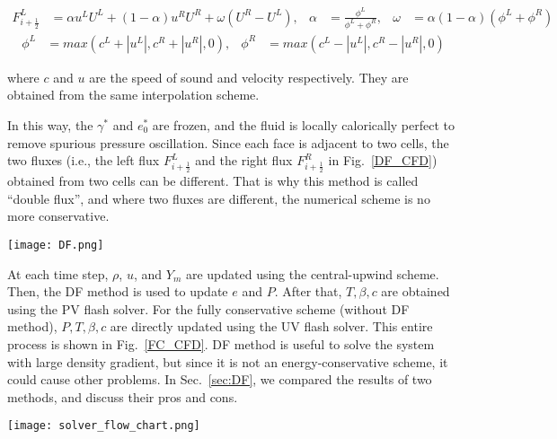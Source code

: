 \begin{align} F^L_{i+\frac{1}{2}} &= \alpha u^LU^L + \left(1-\alpha\right)u^R U^R + \omega \left(U^R-U^L\right),&
\alpha &= \frac{\phi^L}{\phi^L +\phi^R},&
 \omega &= \alpha \left(1-\alpha\right) \left(\phi^L+\phi^R\right)
 \end{align}
\begin{align} \phi^L& = max\left(c^L+|u^L|,c^R + |u^R|,0\right),&\phi^R &= max\left(c^L-|u^L|,c^R - |u^R|,0\right)
\end{align}

where $c$ and $u$ are the speed of sound and velocity respectively. They are obtained from the same interpolation scheme.


In this way, the $\gamma^*$ and $e_0^*$ are frozen, and the fluid is locally calorically perfect to remove spurious pressure oscillation. 
Since each face is adjacent to two cells, the two fluxes (i.e., the left flux $F^L_{i+\frac{1}{2}}$ and the right flux $F^R_{i+\frac{1}{2}}$ in Fig.~\ref{DF_CFD}) obtained from two cells can be different. That is why this method is called ``double flux'', and where two fluxes are different, the numerical scheme is no more conservative. 
\begin{figure*}[htbp]
\centering
\texttt{[image: DF.png]}
\caption{Schematic of the double flux (DF) method in a one-dimensional mesh.}
\label{DF_CFD} 
\end{figure*}

At each time step, $\rho$, $u$, and $Y_m$ are updated using the central-upwind scheme. Then, the DF method is used to update $e$ and $P$. After that, $T,\beta,c$ are obtained using the PV flash solver. For the fully conservative scheme (without DF method), $P,T,\beta,c$ are directly updated using the UV flash solver. This entire process is shown in Fig.~\ref{FC_CFD}. DF method is useful to solve the system with large density gradient, but since it is not an energy-conservative scheme, it could cause other problems. In Sec.~\ref{sec:DF}, we compared the results of two methods, and discuss their pros and cons.

\begin{figure*}[htbp]
\centering
\texttt{[image: solver\_flow\_chart.png]}
\caption{Flow chart of the VLE-based CFD framework.}
\label{FC_CFD} 
\end{figure*}

